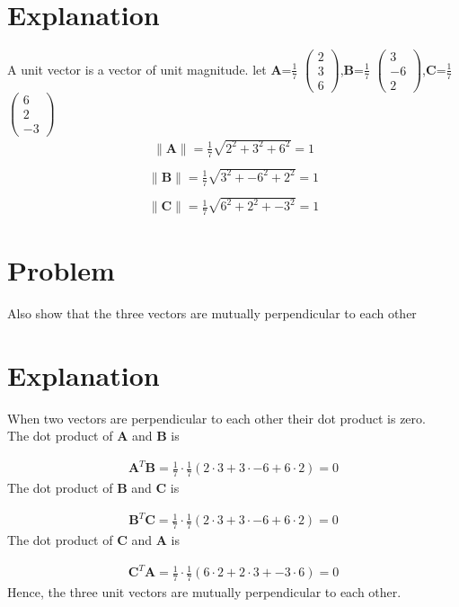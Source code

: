 \documentclass[journal,12pt,twocolumn]{IEEEtran}
\newcommand{\norm}[1]{\| #1 \|}
\begin{document}
\section{Explanation}
A unit vector is a vector of unit magnitude.
\vspace{0.5cm} let $\bm{A}$=\(\frac{1}{7}\) $\begin{pmatrix}2 \\3 \\6\end{pmatrix}$,$\bm{B}$=\(\frac{1}{7}\) $\begin{pmatrix}3 \\-6 \\2\end{pmatrix}$,$\bm{C}$=\(\frac{1}{7}\) $\begin{pmatrix}6 \\2 \\-3\end{pmatrix}$\\
\begin{align}
    \norm{\bm{A}}=\frac{1}{7}\sqrt{2^2+3^2+6^2}=1\\
\end{align}
\begin{align}
    \norm{\bm{B}}=\frac{1}{7}\sqrt{3^2+-6^2+2^2}=1\\
\end{align}
\begin{align}
    \norm{\bm{C}}=\frac{1}{7}\sqrt{6^2+2^2+-3^2}=1
\end{align}
\section{Problem}
Also show that the three vectors are mutually perpendicular to each other
\section{Explanation}
\noindent
When two vectors are perpendicular to each other their dot product is zero.\\
The dot product of $\bm{A}$ and $\bm{B}$ is\par
\begin{align}
    \bm{A}^T\bm{B}=\frac{1}{7}\cdot\frac{1}{7}(2\cdot3+3\cdot-6+6\cdot2)=0
\end{align}
The dot product of $\bm{B}$ and $\bm{C}$ is \par
\begin{align}
    \bm{B}^T\bm{C}=\frac{1}{7}\cdot\frac{1}{7}(2\cdot3+3\cdot-6+6\cdot2)=0
\end{align}
The dot product of $\bm{C}$ and $\bm{A}$ is \par
\begin{align}
    \bm{C}^T\bm{A}=\frac{1}{7}\cdot\frac{1}{7}(6\cdot2+2\cdot3+-3\cdot6)=0
\end{align}
Hence, the three unit vectors are mutually perpendicular to each other.
\end{document}
